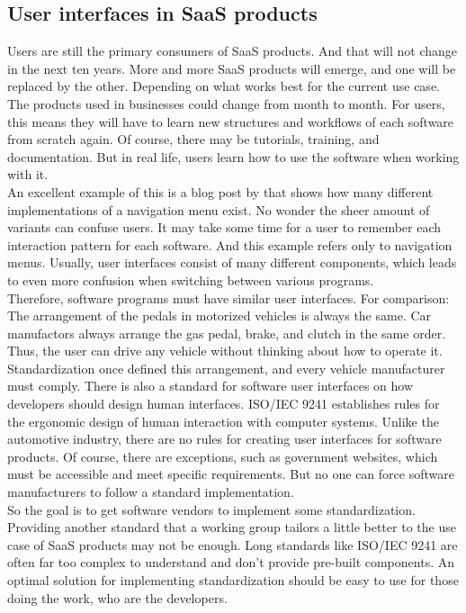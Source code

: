 \subsection{User interfaces in \ac{SaaS} products}
Users are still the primary consumers of \ac{SaaS} products. And that will not change in the next ten years. More and more SaaS products will emerge, and one will be replaced by the other. Depending on what works best for the current use case. The products used in businesses could change from month to month. For users, this means they will have to learn new structures and workflows of each software from scratch again. Of course, there may be tutorials, training, and documentation. But in real life, users learn how to use the software when working with it. \\
An excellent example of this is a blog post by \citeauthor{sernoff_website_2021} that shows how many different implementations of a navigation menu exist. No wonder the sheer amount of variants can confuse users. It may take some time for a user to remember each interaction pattern for each software. And this example refers only to navigation menus.  Usually, user interfaces consist of many different components, which leads to even more confusion when switching between various programs. \\
Therefore, software programs must have similar user interfaces. For comparison: The arrangement of the pedals in motorized vehicles is always the same. Car manufactors always arrange the gas pedal, brake, and clutch in the same order. Thus, the user can drive any vehicle without thinking about how to operate it. Standardization once defined this arrangement, and every vehicle manufacturer must comply. There is also a standard for software user interfaces on how developers should design human interfaces.  ISO/IEC 9241 establishes rules for the ergonomic design of human interaction with computer systems. Unlike the automotive industry, there are no rules for creating user interfaces for software products. Of course, there are exceptions, such as government websites, which must be accessible and meet specific requirements. But no one can force software manufacturers to follow a standard implementation. \\
So the goal is to get software vendors to implement some standardization. Providing another standard that a working group tailors a little better to the use case of \ac{SaaS} products may not be enough. Long standards like ISO/IEC 9241 are often far too complex to understand and don't provide pre-built components. An optimal solution for implementing standardization should be easy to use for those doing the work, who are the developers. \\
